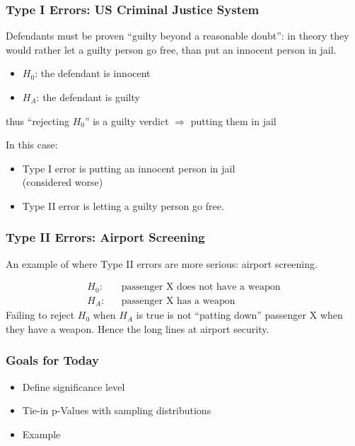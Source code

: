 \documentclass[handout]{beamer}
\newcommand{\blue}[1]{\textcolor{blue2}{#1}}
\begin{document}
\begin{frame}
\frametitle{Type I Errors:  US Criminal Justice System}
Defendants must be proven ``guilty beyond a reasonable doubt'': in theory they would rather let a guilty person go free, than put an innocent person in jail.  

\pause\vskip 0.25cm

\begin{itemize}
\item $H_0$: the defendant is innocent
\item $H_A$: the defendant is guilty
\end{itemize}
\pause thus ``rejecting $H_0$'' is a guilty verdict $\Rightarrow$ putting them in jail

\vskip 0.25cm

\pause In this case:
\begin{itemize}
\item Type I error is putting an innocent person in jail\\
(considered worse)
\item Type II error is letting a guilty person go free.  
\end{itemize}
\end{frame}


\begin{frame}
\frametitle{Type II Errors: Airport Screening}
An example of where Type II errors are more serious:  \blue{airport screening}. 

\pause \begin{eqnarray*}
H_0: && \mbox{passenger X does not have a weapon}\\
H_A: && \mbox{passenger X has a weapon}
\end{eqnarray*}
\pause Failing to reject $H_0$ when $H_A$ is true is not ``patting down'' passenger X when they have a weapon.
\vskip 0.25cm
\pause Hence the long lines at airport security.  
\end{frame}


\begin{frame}[fragile]
\frametitle{Goals for Today}

\begin{itemize}
\item Define significance level
\item Tie-in p-Values with sampling distributions
\item Example
\end{itemize}

\end{frame}
\end{document}
